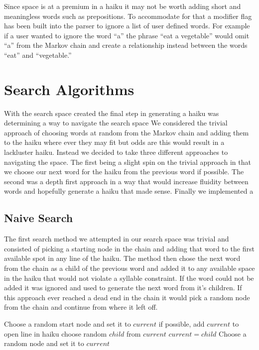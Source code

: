 \documentclass[]{article}
\begin{document}
Since space is at a premium in a haiku it may not be worth adding short and meaningless words such as prepositions. To accommodate for that a modifier flag has been built into the parser to ignore a list of user defined words. For example if a user wanted to ignore the word ``a'' the phrase ``eat a vegetable'' would omit ``a'' from the Markov chain and create a relationship instead between the words ``eat'' and ``vegetable.''

\section{Search Algorithms}
With the search space created the final step in generating a haiku was determining a way to navigate the search space We considered the trivial approach of choosing words at random from the Markov chain and adding them to the haiku where ever they may fit but odds are this would result in a lackluster haiku. Instead we decided to take three different approaches to navigating the space. The first being a slight spin on the trivial approach in that we choose our next word for the haiku from the previous word if possible. The second was a depth first approach in a way that would increase fluidity between words and hopefully generate a haiku that made sense. Finally we implemented a 

\subsection{Naive Search}
The first search method we attempted in our search space was trivial and consisted of picking a starting node in the chain and adding that word to the first available spot in any line of the haiku. The method then chose the next word from the chain as a child of the previous word and added it to any available space in the haiku that would not violate a syllable constraint. If the word could not be added it was ignored and used to generate the next word from it's children. If this approach ever reached a dead end in the chain it would pick a random node from the chain and continue from where it left off.

\begin{algorithm}[H]
	\caption{$Naive\_Search()$} \label{Naive}
	\begin{algorithmic}[1]
		\State Choose a random start node and set it to $current$
			\State if possible, add $current$ to open line in haiku
				\State choose random $child$ from $current$
				\State $current = child$
			\Else
				\State Choose a random node and set it to $current$
			\EndIf
		\EndWhile
	\end{algorithmic}
\end{algorithm}
\end{document}
